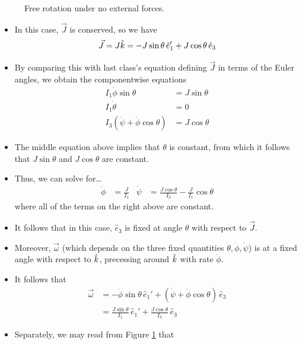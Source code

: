 \documentclass[../notes.tex]{subfiles}
\begin{document}
\begin{itemize}
\begin{figure}[h!]
        \caption{Free rotation under no external forces.}
        \label{fig:FreeRot1}
    \end{figure}
    \begin{itemize}
        \item In this case, $\vec{J}$ is conserved, so we have
        \begin{equation*}
            \vec{J} = J\hat{k}=-J\sin\theta\,\hat{e}_1'+J\cos\theta\,\hat{e}_3
        \end{equation*}
        \item By comparing this with last class's equation defining $\vec{J}$ in terms of the Euler angles, we obtain the componentwise equations
        \begin{align*}
            I_1\dot{\phi}\sin\theta &= J\sin\theta\\
            I_1\dot{\theta} &= 0\\
            I_3(\dot{\psi}+\dot{\phi}\cos\theta) &= J\cos\theta
        \end{align*}
        \item The middle equation above implies that $\theta$ is constant, from which it follows that $J\sin\theta$ and $J\cos\theta$ are constant.
        \item Thus, we can solve for\dots
        \begin{align*}
            \dot{\phi} &= \frac{J}{I_1}&
            \dot{\psi} &= \frac{J\cos\theta}{I_3}-\frac{J}{I_1}\cos\theta
        \end{align*}
        where all of the terms on the right above are constant.
        \item It follows that in this case, $\hat{e}_3$ is fixed at angle $\theta$ with respect to $\vec{J}$.
        \item Moreover, $\vec{\omega}$ (which depends on the three fixed quantities $\dot{\theta},\dot{\phi},\dot{\psi}$) is at a fixed angle with respect to $\hat{k}$, precessing around $\hat{k}$ with rate $\dot{\phi}$.
        \item It follows that
        \begin{align*}
            \vec{\omega} &= -\dot{\phi}\sin\theta\,\hat{e}_1'+(\dot{\psi}+\dot{\phi}\cos\theta)\,\hat{e}_3\\
            &= \frac{J\sin\theta}{I_1}\,\hat{e}_1'+\frac{J\cos\theta}{I_3}\,\hat{e}_3
        \end{align*}
        \item Separately, we may read from Figure \ref{fig:FreeRot1} that
        \begin{equation*}

\end{equation*}
\end{itemize}
\end{itemize}
\end{document}
